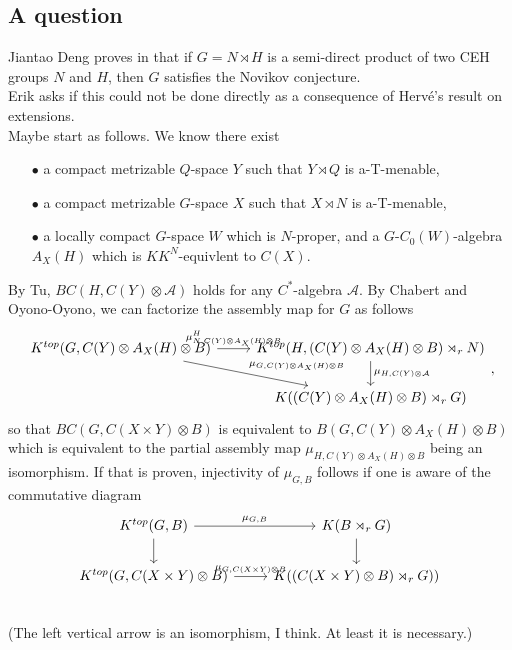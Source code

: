 \subsection{A question}

Jiantao Deng proves in \cite{} that if $G= N \rtimes H$ is a semi-direct product of two CEH groups $N$ and $H$, then $G$ satisfies the Novikov conjecture. \\

Erik asks if this could not be done directly as a consequence of Herv\'e's result on extensions. \\

Maybe start as follows. We know there exist
\begin{itemize}
\item[$\bullet$] a compact metrizable $Q$-space $Y$ such that $Y\rtimes Q$ is a-T-menable,
\item[$\bullet$] a compact metrizable $G$-space $X$ such that $X\rtimes N$ is a-T-menable,
\item[$\bullet$] a locally compact $G$-space $W$ which is $N$-proper, and a $G$-$C_0(W)$-algebra $A_X(H)$ which is $KK^N$-equivlent to $C(X)$. 
\end{itemize}
By Tu, $BC(H, C(Y)\otimes\mathcal A)$ holds for any $C^*$-algebra $\mathcal A$. By Chabert and Oyono-Oyono, we can factorize the assembly map for $G$ as follows
\[\begin{tikzcd}
K^{top}(G, C(Y)\otimes A_X(H)\otimes B) \arrow{rd}{\mu_{G, C(Y)\otimes A_X(H)\otimes B}}\arrow{r}{\mu_{N,C(Y)\otimes A_X(H)\otimes B}^H} 
		& K^{top}(H, (C(Y)\otimes A_X(H)\otimes B)\rtimes_r N) \arrow{d}{\mu_{H , C(Y)\otimes \mathcal A}} \\
		& K((C(Y)\otimes A_X(H)\otimes B)\rtimes_r G)\end{tikzcd},\] 
so that $BC(G,C(X\times Y)\otimes B)$ is equivalent to $B(G, C(Y)\otimes A_X(H)\otimes B)$ which is equivalent to the partial assembly map $\mu_{H, C(Y)\otimes A_X(H)\otimes B}$ being an isomorphism. If that is proven, injectivity of $\mu_{G,B}$ follows if one is aware of the commutative diagram
\[\begin{tikzcd}
K^{top}(G,B)\arrow{d} \arrow{r}{\mu_{G,B}} & K(B\rtimes_r G) \arrow{d} \\
K^{top}(G, C(X\times Y)\otimes B) \arrow{r}{ \mu_{G,C(X\times Y)\otimes B} } & K( (C(X\times Y)\otimes B)\rtimes_r G)) \\
\end{tikzcd}\]
(The left vertical arrow is an isomorphism, I think. At least it is necessary.)

